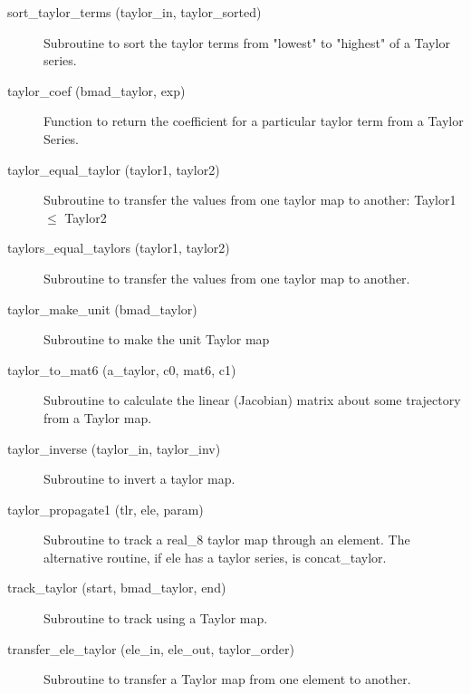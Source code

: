 \begin{description}
\label{r:sort.taylor.terms}
\item[sort_taylor_terms (taylor_in, taylor_sorted)] \Newline
Subroutine to sort the taylor terms from "lowest" to "highest" of a
Taylor series.

\label{r:taylor.coef}
\item[taylor_coef (bmad_taylor, exp)] \Newline 
Function to return the coefficient for a particular taylor term from a
Taylor Series.

\label{r:taylor.equal.taylor}
\item[taylor_equal_taylor (taylor1, taylor2)] \Newline
Subroutine to transfer the values from one taylor map to another:
Taylor1 $\le$ Taylor2

\label{r:taylors.equal.taylors}
\item[taylors_equal_taylors (taylor1, taylor2)] \Newline 
Subroutine to transfer the values from one taylor map to another.

\label{r:taylor.make.unit}
\item[taylor_make_unit (bmad_taylor)] \Newline
Subroutine to make the unit Taylor map

\label{r:taylor.to.mat6}
\item[taylor_to_mat6 (a_taylor, c0, mat6, c1)] \Newline
Subroutine to calculate the linear (Jacobian) matrix about some
trajectory from a Taylor map.

\label{r:taylor.inverse}
\item[taylor_inverse (taylor_in, taylor_inv)] \Newline
Subroutine to invert a taylor map. 

\label{r:taylor.propagate1}
\item[taylor_propagate1 (tlr, ele, param)] \Newline
Subroutine to track a real_8 taylor map through an element. 
The alternative routine, if ele has a taylor series, is concat_taylor. 

\label{r:track.taylor}
\item[track_taylor (start, bmad_taylor, end)] \Newline
Subroutine to track using a Taylor map. 

\label{r:transfer.ele.taylor}
\item[transfer_ele_taylor (ele_in, ele_out, taylor_order)] \Newline 
Subroutine to transfer a Taylor map from one element to another.


\end{description}

